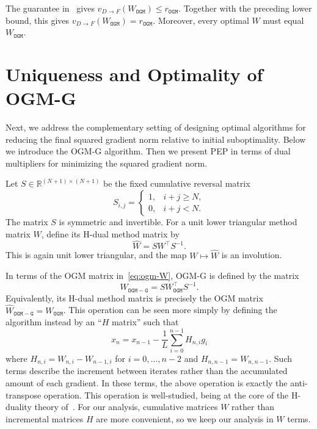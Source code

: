 \documentclass[11pt]{article}
\begin{document}
The guarantee in~\cite{KF16} gives $v_{D\rightarrow F}(W_\mathtt{OGM})\leq r_\mathtt{OGM}$.
Together with the preceding lower bound, this gives
$v_{D\rightarrow F}(W_\mathtt{OGM})=r_\mathtt{OGM}$. Moreover, every optimal $W$ must equal $W_\mathtt{OGM}$.





\section{Uniqueness and Optimality of OGM-G}\label{sec:ogmg}

Next, we address the complementary setting of designing optimal algorithms for reducing the final squared gradient norm relative to initial suboptimality. Below we introduce the OGM-G algorithm. Then we present PEP in terms of dual multipliers for minimizing the squared gradient norm. 

Let $S\in\mathbb{R}^{(N+1)\times(N+1)}$ be the fixed cumulative reversal
matrix
\begin{equation*}
    S_{i,j}=
    \begin{cases}
        1,&i+j\geq N,\\
        0,&i+j<N.
    \end{cases}
\end{equation*}
The matrix $S$ is symmetric and invertible. For a unit lower triangular
method matrix $W$, define its H-dual method matrix by
\begin{equation*}
    \widehat W=SW^\top S^{-1}.
\end{equation*}
This is again unit lower triangular, and the map $W\mapsto\widehat W$ is an
involution.

In terms of the OGM matrix in~\eqref{eq:ogm-W}, OGM-G is defined by the matrix
\begin{equation*}
    W_\mathtt{OGM-G}
    =
    S W_\mathtt{OGM}^\top S^{-1}.
\end{equation*}
Equivalently, its H-dual method matrix is precisely the OGM matrix
$\widehat W_\mathtt{OGM-G}=W_\mathtt{OGM}$. This operation can be seen more
simply by defining the algorithm instead by an ``$H$ matrix'' such that
\begin{equation*}
    x_n=x_{n-1}-\frac{1}{L}\sum_{i=0}^{n-1}H_{n,i}g_i
\end{equation*}
where $H_{n,i}=W_{n,i}-W_{n-1,i}$ for $i=0,\dots,n-2$ and $H_{n,n-1}=W_{n,n-1}$. Such terms describe the increment between iterates rather than the accumulated
amount of each gradient. In these terms, the above operation is exactly the
anti-transpose operation. This operation is well-studied, being at the core of
the H-duality theory of~\cite{KOPR23}. For our analysis, cumulative matrices
$W$ rather than incremental matrices $H$ are more convenient, so we keep our
analysis in $W$ terms.
\end{document}
